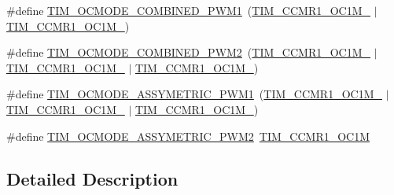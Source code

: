 \begin{DoxyCompactItemize}
\item 
\#define \mbox{\hyperlink{group___t_i_m___output___compare__and___p_w_m__modes_gaa13e0cb2370d61cfee1241498733b38b}{T\+I\+M\+\_\+\+O\+C\+M\+O\+D\+E\+\_\+\+C\+O\+M\+B\+I\+N\+E\+D\+\_\+\+P\+W\+M1}}~(\mbox{\hyperlink{group___peripheral___registers___bits___definition_gac93dfe7865726bc84363684b9fa01c93}{T\+I\+M\+\_\+\+C\+C\+M\+R1\+\_\+\+O\+C1\+M\+\_}} $\vert$ \mbox{\hyperlink{group___peripheral___registers___bits___definition_gac024f6b9972b940925ab5786ee38701b}{T\+I\+M\+\_\+\+C\+C\+M\+R1\+\_\+\+O\+C1\+M\+\_}})
\item 
\#define \mbox{\hyperlink{group___t_i_m___output___compare__and___p_w_m__modes_gaf983419ff3d5bc0ca8d122bb8f321eff}{T\+I\+M\+\_\+\+O\+C\+M\+O\+D\+E\+\_\+\+C\+O\+M\+B\+I\+N\+E\+D\+\_\+\+P\+W\+M2}}~(\mbox{\hyperlink{group___peripheral___registers___bits___definition_gac93dfe7865726bc84363684b9fa01c93}{T\+I\+M\+\_\+\+C\+C\+M\+R1\+\_\+\+O\+C1\+M\+\_}} $\vert$ \mbox{\hyperlink{group___peripheral___registers___bits___definition_ga410a4752a98081bad8ab3f72b28e7c5f}{T\+I\+M\+\_\+\+C\+C\+M\+R1\+\_\+\+O\+C1\+M\+\_}} $\vert$ \mbox{\hyperlink{group___peripheral___registers___bits___definition_gac024f6b9972b940925ab5786ee38701b}{T\+I\+M\+\_\+\+C\+C\+M\+R1\+\_\+\+O\+C1\+M\+\_}})
\item 
\#define \mbox{\hyperlink{group___t_i_m___output___compare__and___p_w_m__modes_ga4ac5cec9a2a20452a800daf0268e4549}{T\+I\+M\+\_\+\+O\+C\+M\+O\+D\+E\+\_\+\+A\+S\+S\+Y\+M\+E\+T\+R\+I\+C\+\_\+\+P\+W\+M1}}~(\mbox{\hyperlink{group___peripheral___registers___bits___definition_gac93dfe7865726bc84363684b9fa01c93}{T\+I\+M\+\_\+\+C\+C\+M\+R1\+\_\+\+O\+C1\+M\+\_}} $\vert$ \mbox{\hyperlink{group___peripheral___registers___bits___definition_ga8b5f6ec25063483641d6dc065d96d2b5}{T\+I\+M\+\_\+\+C\+C\+M\+R1\+\_\+\+O\+C1\+M\+\_}} $\vert$ \mbox{\hyperlink{group___peripheral___registers___bits___definition_gac024f6b9972b940925ab5786ee38701b}{T\+I\+M\+\_\+\+C\+C\+M\+R1\+\_\+\+O\+C1\+M\+\_}})
\item 
\#define \mbox{\hyperlink{group___t_i_m___output___compare__and___p_w_m__modes_gaca5fb8f08451b9fff093bd79da4e574b}{T\+I\+M\+\_\+\+O\+C\+M\+O\+D\+E\+\_\+\+A\+S\+S\+Y\+M\+E\+T\+R\+I\+C\+\_\+\+P\+W\+M2}}~\mbox{\hyperlink{group___peripheral___registers___bits___definition_ga6ddb3dc889733e71d812baa3873cb13b}{T\+I\+M\+\_\+\+C\+C\+M\+R1\+\_\+\+O\+C1M}}
\end{DoxyCompactItemize}


\subsection{Detailed Description}


